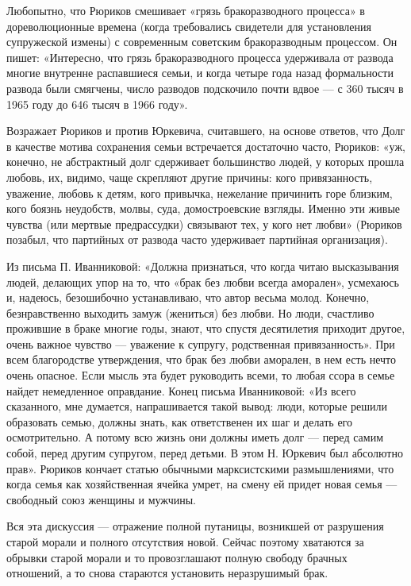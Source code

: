 Любопытно, что Рюриков смешивает «грязь бракоразводного процесса» в
дореволюционные времена (когда требовались свидетели для установления
супружеской измены) с современным советским бракоразводным процессом.
Он пишет: «Интересно, что грязь бракоразводного процесса удерживала от
развода многие внутренне распавшиеся семьи, и когда четыре года назад
формальности развода были смягчены, число разводов подскочило почти
вдвое --- с 360 тысяч в 1965 году до 646 тысяч в 1966 году».

Возражает Рюриков и против Юркевича, считавшего, на основе ответов,
что Долг в качестве мотива сохранения семьи встречается достаточно
часто, Рюриков: «уж, конечно, не абстрактный долг сдерживает
большинство людей, у которых прошла любовь, их, видимо, чаще скрепляют
другие причины: кого привязанность, уважение, любовь к детям, кого
привычка, нежелание причинить горе близким, кого боязнь неудобств,
молвы, суда, домостроевские взгляды. Именно эти живые чувства (или
мертвые предрассудки) связывают тех, у кого нет любви» (Рюриков
позабыл, что партийных от развода часто удерживает партийная
организация).

Из письма П. Иванниковой: «Должна признаться, что когда читаю
высказывания людей, делающих упор на то, что «брак без любви всегда
аморален», усмехаюсь и, надеюсь, безошибочно устанавливаю, что автор
весьма молод. Конечно, безнравственно выходить замуж (жениться) без
любви. Но люди, счастливо прожившие в браке многие годы, знают, что
спустя десятилетия приходит другое, очень важное чувство --- уважение
к супругу, родственная привязанность». При всем благородстве
утверждения, что брак без любви аморален, в нем есть нечто очень
опасное. Если мысль эта будет руководить всеми, то любая ссора в семье
найдет немедленное оправдание. Конец письма Иванниковой: «Из всего
сказанного, мне думается, напрашивается такой вывод: люди, которые
решили образовать семью, должны знать, как ответственен их шаг и
делать его осмотрительно. А потому всю жизнь они должны иметь долг ---
перед самим собой, перед другим супругом, перед детьми. В этом Н.
Юркевич был абсолютно прав». Рюриков кончает статью обычными
марксистскими размышлениями, что когда семья как хозяйственная ячейка
умрет, на смену ей придет новая семья --- свободный союз женщины и
мужчины.

Вся эта дискуссия --- отражение полной путаницы, возникшей от
разрушения старой морали и полного отсутствия новой. Сейчас поэтому
хватаются за обрывки старой морали и то провозглашают полную свободу
брачных отношений, а то снова стараются установить неразрушимый брак.

